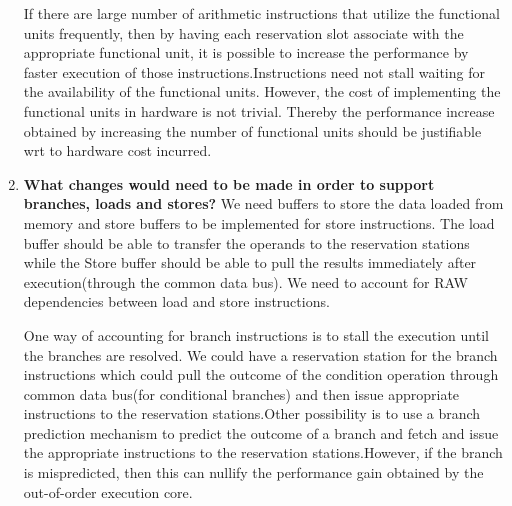 \begin{enumerate}
        If there are large number of arithmetic instructions that utilize the functional units frequently, then by having each reservation slot associate with the appropriate functional unit, it is possible to increase the performance by faster execution of those instructions.Instructions need not stall waiting for the availability of the functional units. However, the cost of implementing the functional units in hardware is not trivial. Thereby the performance increase obtained by increasing the number of functional units should be justifiable wrt to hardware cost incurred.


    \item
        {\bf What changes would need to be made in order to support branches, loads and stores?}
        We need buffers to store the data loaded from memory and store buffers to be implemented for store instructions. The load buffer should be able to transfer the operands to the reservation stations while the Store buffer should be able to pull the results immediately after execution(through the common data bus).
We need to account for RAW dependencies between load and store instructions.

One way of accounting for branch instructions is to stall the execution until the branches are resolved. We could have a reservation station for the branch instructions which could pull the outcome of the condition operation through common data bus(for conditional branches) and then issue appropriate instructions to the reservation stations.Other possibility is to use a branch prediction mechanism to predict the outcome of a branch and fetch and issue the appropriate instructions to the reservation stations.However, if the branch is mispredicted, then this can nullify the performance gain obtained by the out-of-order execution core.\cite{text}
        
\end{enumerate}
